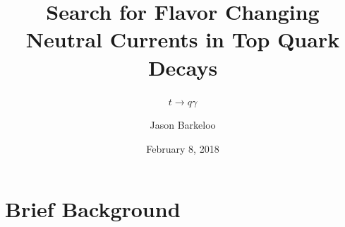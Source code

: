 \documentclass[10pt]{beamer}
\begin{document}
\title{Search for Flavor Changing Neutral Currents in Top Quark Decays}
\subtitle{$t \rightarrow q \gamma$}
\author[Barkeloo]{Jason Barkeloo}


\date{February 8, 2018}
\frame{\titlepage}
\section{Brief Background}



%
%
\end{document}
